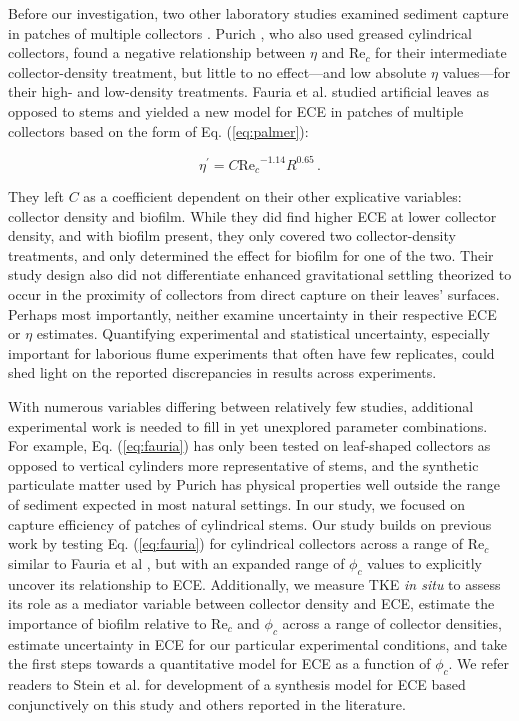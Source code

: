 \documentclass[geosciences,article,submit,moreauthors,pdftex]{Definitions/mdpi}
\newcommand\Rey{\mathrm{Re}}
\begin{document}
Before our investigation, two other laboratory studies examined sediment capture in patches of multiple collectors \cite{purich2006capture,Fauria_2015}. Purich \cite{purich2006capture}, who also used greased cylindrical collectors, found a negative relationship between $\eta$ and $\Rey_c$ for their intermediate collector-density treatment, but little to no effect---and low absolute $\eta$ values---for their high- and low-density treatments. Fauria et al. \cite{Fauria_2015} studied artificial leaves as opposed to stems and yielded a new model for ECE in patches of multiple collectors based on the form of Eq. (\ref{eq:palmer}):

\begin{equation}
    \eta^\prime=C{\Rey_c}^{-1.14}R^{0.65}\,.
    \label{eq:fauria}
\end{equation}

\noindent They left $C$ as a coefficient dependent on their other explicative variables: collector density and biofilm. While they did find higher ECE at lower collector density, and with biofilm present, they only covered two collector-density treatments, and only determined the effect for biofilm for one of the two. Their study design also did not differentiate enhanced gravitational settling theorized to occur in the proximity of collectors from direct capture on their leaves' surfaces. Perhaps most importantly, neither examine uncertainty in their respective ECE or $\eta$ estimates. Quantifying experimental and statistical uncertainty, especially important for laborious flume experiments that often have few replicates, could shed light on the reported discrepancies in results across experiments. 

With numerous variables differing between relatively few studies, additional experimental work is needed to fill in yet unexplored parameter combinations. For example, Eq. (\ref{eq:fauria}) has only been tested on leaf-shaped collectors as opposed to vertical cylinders more representative of stems, and the synthetic particulate matter used by Purich \cite{purich2006capture} has physical properties well outside the range of sediment expected in most natural settings. In our study, we focused on capture efficiency of patches of cylindrical stems. Our study builds on previous work by testing Eq. (\ref{eq:fauria}) for cylindrical collectors across a range of $\Rey_c$ similar to Fauria et al \cite{Fauria_2015}, but with an expanded range of $\phi_c$ values to explicitly uncover its relationship to ECE. Additionally, we measure TKE \textit{in situ} to assess its role as a mediator variable between collector density and ECE, estimate the importance of biofilm relative to $\Rey_c$ and $\phi_c$ across a range of collector densities, estimate uncertainty in ECE for our particular experimental conditions, and take the first steps towards a quantitative model for ECE as a function of $\phi_c$. We refer readers to Stein et al. \cite{stein2021} for development of a synthesis model for ECE based conjunctively on this study and others reported in the literature. 
\end{document}
